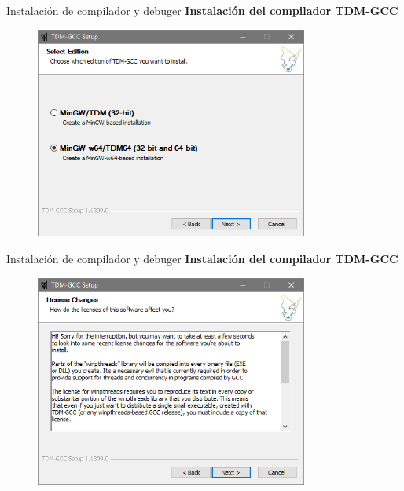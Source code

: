 \begin{frame}[fragile]{Instalación de compilador y debuger}
 \textbf{Instalación del compilador TDM-GCC}
  \begin{figure}
      \includegraphics[width=0.8\textwidth]{./resources/TDMGCC_Step_02.PNG}
  \end{figure}
\end{frame}

\begin{frame}[fragile]{Instalación de compilador y debuger}
 \textbf{Instalación del compilador TDM-GCC}
  \begin{figure}
      \includegraphics[width=0.8\textwidth]{./resources/TDMGCC_Step_03.PNG}
  \end{figure}
\end{frame}

